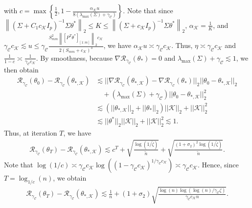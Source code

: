 \documentclass{article}
\begin{document}
with $c = \max\left\{\frac{1}{2}, 1 - \frac{\alpha_{\mathcal{K}} u}{8(\lambda_{\max}(\Sigma) + \gamma_{\mathcal{C}})}\right\}$. Note that since $\left\|\left(\Sigma + C_1c_{\mathcal{K}}I_p\right)^{-1}\Sigma\theta^*\right\|_2 \leq K \leq \left\|\left(\Sigma + c_{\mathcal{K}}I_p\right)^{-1}\Sigma\theta^*\right\|_2$, $\alpha_{\mathcal{K}} = \frac{1}{K}$, and $\gamma_{\mathcal{C}}c_{\mathcal{K}} \lesssim u \leq \gamma_{\mathcal{C}}\frac{S_{mm}^2\left\|[P^T\theta^*]_{[1:m]}\right\|_2c_{\mathcal{K}}}{2(S_{mm} + c_{\mathcal{K}})^3}$, we have $\alpha_{\mathcal{K}} u \asymp \gamma_{\mathcal{C}}c_{\mathcal{K}}$. Thus, $\eta \asymp \gamma_{\mathcal{C}}c_{\mathcal{K}}$ and $\frac{1}{1 - c} \asymp \frac{1}{\gamma_{\mathcal{C}}c_{\mathcal{K}}}$. By smoothness, because $\nabla\mathcal{R}_{\gamma_{\mathcal{C}}}(\theta_{*}) = 0$ and $\lambda_{\max}(\Sigma) + \gamma_{\mathcal{C}} \lesssim 1$, we then obtain 
\begin{align*}
\mathcal{R}_{\gamma_{\mathcal{C}}}(\theta_0) - \mathcal{R}_{\gamma_{\mathcal{C}}}(\theta_{*, \mathcal{K}}) &\lesssim ||\nabla\mathcal{R}_{\gamma_{\mathcal{C}}}(\theta_{*, \mathcal{K}}) - \nabla\mathcal{R}_{\gamma_{\mathcal{C}}}(\theta_*)||_2||\theta_0 - \theta_{*, \mathcal{K}}||_2\\
& \quad + (\lambda_{\max}(\Sigma) + \gamma_{\mathcal{C}})||\theta_0 - \theta_{*, \mathcal{K}}||_2^2\\
&\lesssim (||\theta_{*, \mathcal{K}}||_2 + ||\theta_*||_2)||\mathcal{K}||_2 + ||\mathcal{K}||_2^2\\
&\lesssim ||\theta^*||_2||\mathcal{K}||_2 + ||\mathcal{K}||_2^2 \lesssim 1.
\end{align*}
Thus, at iteration $T$, we have
\begin{align*}
\mathcal{R}_{\gamma_{\mathcal{C}}}(\theta_T) - \mathcal{R}_{\gamma_{\mathcal{C}}}(\theta_{*, \mathcal{K}}) \lesssim c^T + \sqrt{\frac{\log(1/\widetilde{\zeta})}{\widetilde{n}}} + \sqrt{\frac{(1 + \sigma_2)^2\log(1/\widetilde{\zeta})}{\widetilde{n}}}.
\end{align*}
Note that $\log(1/c) \asymp \gamma_{\mathcal{C}}c_{\mathcal{K}}\log\left((1 - \gamma_{\mathcal{C}}c_{\mathcal{K}})^{1/\gamma_{\mathcal{C}}c_{\mathcal{K}}}\right) \asymp\gamma_{\mathcal{C}}c_{\mathcal{K}}$. Hence, since $T = \log_{1/c}\left(n\right)$, we obtain
\begin{align*}
\mathcal{R}_{\gamma_{\mathcal{C}}}(\theta_T) - \mathcal{R}_{\gamma_{\mathcal{C}}}(\theta_{*, \mathcal{K}}) \lesssim \frac{1}{n} + (1 + \sigma_2)\sqrt{\frac{\log(n)\log\left(\log(n)/\gamma_{\mathcal{C}}\zeta\right)}{\gamma_{\mathcal{C}}c_{\mathcal{K}}n}}.
\end{align*}
\end{document}
